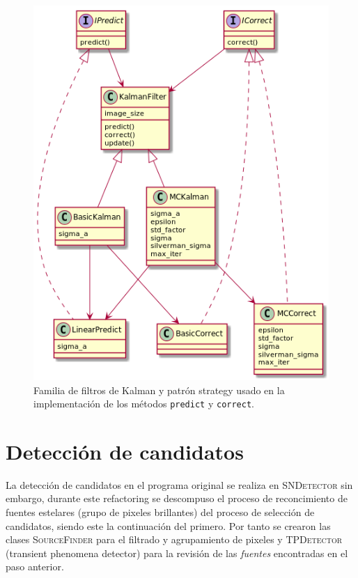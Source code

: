 \begin{figure}
\centering
\includegraphics[scale=.5]{images/kalmanfilter_class}
\caption{Familia de filtros de Kalman y patr\'on strategy usado en la implementaci\'on de los m\'etodos \texttt{predict} y \texttt{correct}.}
\label{fig:ref1}
\end{figure}

\section{Detecci\'on de candidatos}
La detecci\'on de candidatos en el programa original se realiza en \textsc{SNDetector} sin embargo, durante este refactoring se descompuso el proceso de reconcimiento de fuentes estelares (grupo de pixeles brillantes) del proceso de selecci\'on de candidatos, siendo este la continuaci\'on del primero. Por tanto se crearon las clases \textsc{SourceFinder} para el filtrado y agrupamiento de pixeles y \textsc{TPDetector} (transient phenomena detector) para la revisi\'on de las \textit{fuentes} encontradas en el paso anterior.
